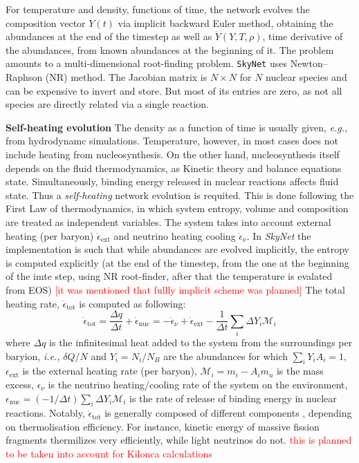 \documentclass[11pt,a4paper,headinclude=true,DIV=14,BCOR=8mm,chapterprefix,listof=totoc,twoside,openright,abstracton]{scrbook}
\newcommand{\red}[1]{\textcolor{red}{#1}}
\begin{document}
\begin{sidenote}
    For temperature and density, functions of time, the network evolves the composition vector $Y(t)$ via implicit backward Euler method, obtaining the abundances at the end of the timestep as well as $\dot{Y}(Y,T,\rho)$, time derivative of the abundances, from known abundances at the beginning of it. 
    The problem amounts to a multi-dimensional root-finding problem. \texttt{SkyNet} uses Newton–Raphson (NR) method. The Jacobian matrix is $N\times N$ for $N$ nuclear species and can be expensive to invert and store. But most of its entries are zero, as not all species are directly related via a single reaction. 
\end{sidenote}
\begin{sidenote}
    \textbf{Self-heating evolution}
    The density as a function of time is usually given, \textit{e.g.,} from hydrodynamc simulations. Temperature, however, in most cases does not include heating from nucleosynthesis. On the other hand, nucleosynthesis itself depends on the fluid thermodynamics, as Kinetic theory and balance equations state. Simultaneously, binding energy released in nuclear reactions affects fluid state. Thus a \textit{self-heating} network evolution is requited. This is done following the First Law of thermodynamics, in which system entropy, volume and composition are treated as independent variables.
    The system takes into account external heating (per baryon) $\dot{\epsilon}_{\text{ext}}$ and neutrino heating cooling $\dot{\epsilon}_{\nu}$.
    In \textit{SkyNet} the implementation is such that while abundances are evolved implicitly,
    the entropy is computed explicitly (at the end of the timestep, from the one at the beginning of the imte step, using NR root-finder, after that the temperature is evalated from EOS)
    \red{[it was mentioned that fullly implicit scheme was planned]}
    The total heating rate, $\dot{\epsilon}_{\text{tot}}$ is computed as following:
    \begin{equation}
        \dot{\epsilon}_{\text{tot}} = \frac{\Delta q}{\Delta t} + \dot{\epsilon}_{\text{nuc}} = -\dot{\epsilon}_{\nu} + \dot{\epsilon}_{\text{ext}} - \frac{1}{\Delta t}\sum_i \Delta Y_i \mathcal{M}_i
    \end{equation}
    where $\Delta q$ is the infinitesimal heat added to the system from the surroundings per baryion, \textit{i.e.,} $\delta Q/N$ and $Y_i=N_i/N_B$ are the abundances for which $\sum_i Y_i A_i = 1$, $\epsilon_{\text{ext}}$ is the external heating rate (per baryon), $\mathcal{M}_i=m_i - A_i m_u$ is the mass excess, $\epsilon_{\nu}$ is the neutrino heating/cooling rate of the system on the environment, $\epsilon_{\text{nuc}} = (-1/\Delta t)\sum_i\Delta Y_i \mathcal{M}_i$ is the rate of release of binding energy in nuclear reactions.
    Notably, $\dot{\epsilon}_{\text{tot}}$ is generally composed of different components \cite{Barnes:2016umi}, depending on thermolisation efficiency. For instance, kinetic energy of massive fission fragments thermilizes very efficiently, while light neutrinos do not. \red{this is planned to be taken into account for Kilonca calculations} 
\end{sidenote}
\end{document}
